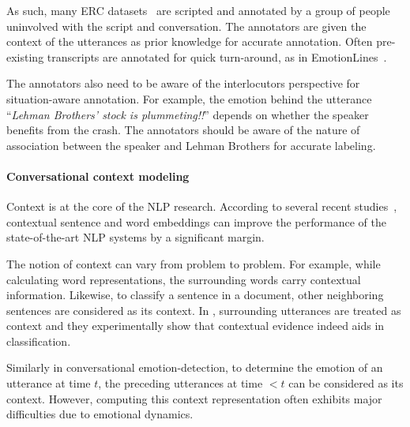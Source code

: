 \documentclass{IEEEtran}\usepackage[pdftex]{graphicx}
\begin{document}
	As such, many ERC datasets~\citep{busso2008iemocap} are scripted and annotated by a
	group of people
	uninvolved with the script and conversation. The annotators are given the context
	of the utterances as prior knowledge for accurate annotation. Often pre-existing transcripts are annotated for quick turn-around, as in EmotionLines~\citep{chen2018emotionlines}. 
	
	The annotators also need to be aware of the interlocutors
	perspective for situation-aware annotation. For example, the emotion behind the
	utterance ``\textit{Lehman Brothers' stock is plummeting!!}'' depends on whether
	the speaker benefits from the crash. The annotators should be aware of the nature
	of association between the speaker and Lehman Brothers for accurate labeling.
	
	\paragraph{Conversational context modeling}
	
	Context is at the core of the NLP research. According to several recent studies~\citep{peters2018deep,devlin2018bert}, contextual sentence and word embeddings can improve the performance of the state-of-the-art NLP systems by a significant margin.
	
	The notion of context can vary from problem to problem. For example, while calculating word representations, the surrounding words carry contextual information. Likewise, to classify a sentence in a document, other neighboring sentences are considered as its context. In \citet{poria2017context}, surrounding utterances are treated as context and they experimentally show that contextual evidence indeed aids in classification.
	
	Similarly in conversational emotion-detection, to determine the emotion of an utterance at time $t$, the preceding utterances at time $<t$ can be considered as its context. However, computing this context representation often exhibits major difficulties due to emotional dynamics.
	
\end{document}
